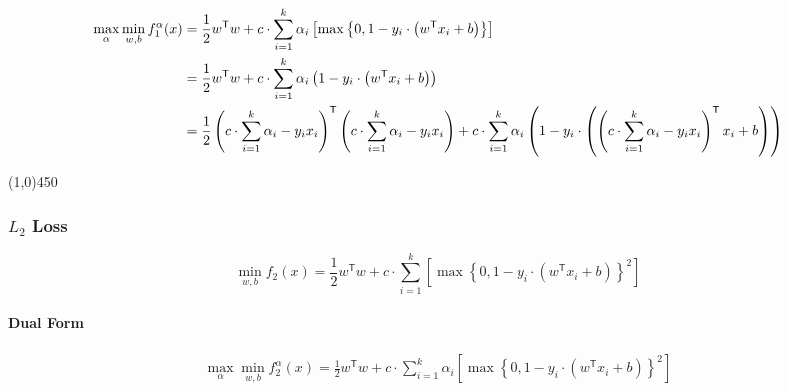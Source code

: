 \documentclass[12pt,landscape]{article}
\newcommand{\hr}{\begin{center} \line(1,0){450} \end{center}}
\newcommand{\tr}{^\mathsf{T}}
\begin{document}
\begin{align}
\max\limits_{\alpha} \min\limits_{w,b} f_1^\alpha(x) &= \frac{1}{2} w\tr w +c \cdot \sum\limits_{i=1}^k \alpha_i \left[ \oneLossReg \right] \nonumber \\
&= \frac{1}{2} w\tr w +c \cdot \sum\limits_{i=1}^k \alpha_i \left(  1-y_i \cdot \left( w\tr x_i + b \right) \right)\\
&= \frac{1}{2} \left( c \cdot \sum\limits_{i=1}^k \alpha_i  -y_i x_i \right)\tr \left( c \cdot \sum\limits_{i=1}^k \alpha_i  -y_i x_i \right) +c \cdot \sum\limits_{i=1}^k \alpha_i \left(  1-y_i \cdot \left( \left( c \cdot \sum\limits_{i=1}^k \alpha_i  -y_i x_i \right)\tr x_i + b \right) \right)\\
\end{align}


\hr
\subsubsection*{$L_2$ Loss}
\begin{equation}
\min\limits_{w,b} f_2(x) = \frac{1}{2} w\tr w +c \cdot \sum\limits_{i=1}^k \left[ \max \left\{ 0,1-y_i \cdot \left( w\tr x_i + b \right) \right\}^2\right]
\end{equation}
\newcommand{\twoLossReg}{\max \left\{ 0,1-y_i \cdot \left( w\tr x_i + b \right)\right\}^2 }

\paragraph{Dual Form}
\begin{align*}
\max\limits_{\alpha} \min\limits_{w,b} f^{\alpha}_2(x) = \frac{1}{2} w\tr w +c \cdot \sum\limits_{i=1}^k \alpha_i \left[ \twoLossReg \right]\\
\end{align*}
\end{document}
